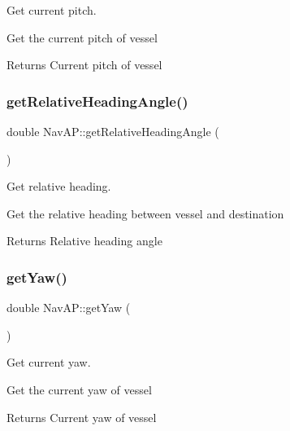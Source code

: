 Get current pitch. 

Get the current pitch of vessel \begin{DoxyReturn}{Returns}
Current pitch of vessel 
\end{DoxyReturn}
\mbox{\label{classNavAP_a642bd070e1487f14e3ced7eea42784b9}} 
\subsubsection{\texorpdfstring{get\+Relative\+Heading\+Angle()}{getRelativeHeadingAngle()}}
{\footnotesize\ttfamily double Nav\+A\+P\+::get\+Relative\+Heading\+Angle (\begin{DoxyParamCaption}{ }\end{DoxyParamCaption})\hspace{0.3cm}{\ttfamily [private]}}



Get relative heading. 

Get the relative heading between vessel and destination \begin{DoxyReturn}{Returns}
Relative heading angle 
\end{DoxyReturn}
\mbox{\label{classNavAP_a121eed90683e2fd3b0d55cc0ed707b5e}} 
\subsubsection{\texorpdfstring{get\+Yaw()}{getYaw()}}
{\footnotesize\ttfamily double Nav\+A\+P\+::get\+Yaw (\begin{DoxyParamCaption}{ }\end{DoxyParamCaption})\hspace{0.3cm}{\ttfamily [private]}}



Get current yaw. 

Get the current yaw of vessel \begin{DoxyReturn}{Returns}
Current yaw of vessel 
\end{DoxyReturn}
\mbox{\label{classNavAP_a66103064c75286521189e4c4924942db}} 
